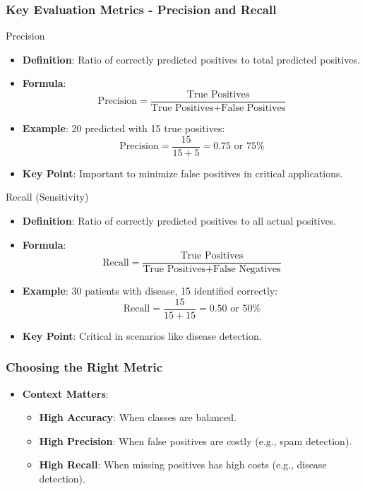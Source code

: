 \documentclass[aspectratio=169]{beamer}
\begin{document}
\begin{frame}[fragile]
    \frametitle{Key Evaluation Metrics - Precision and Recall}
    \begin{block}{Precision}
        \begin{itemize}
            \item \textbf{Definition}: Ratio of correctly predicted positives to total predicted positives.
            \item \textbf{Formula}:
            \begin{equation}
            \text{Precision} = \frac{\text{True Positives}}{\text{True Positives} + \text{False Positives}}
            \end{equation}
            \item \textbf{Example}: 20 predicted with 15 true positives:
            \[
            \text{Precision} = \frac{15}{15 + 5} = 0.75 \text{ or } 75\%
            \]
            \item \textbf{Key Point}: Important to minimize false positives in critical applications.
        \end{itemize}
    \end{block}

    \begin{block}{Recall (Sensitivity)}
        \begin{itemize}
            \item \textbf{Definition}: Ratio of correctly predicted positives to all actual positives.
            \item \textbf{Formula}:
            \begin{equation}
            \text{Recall} = \frac{\text{True Positives}}{\text{True Positives} + \text{False Negatives}}
            \end{equation}
            \item \textbf{Example}: 30 patients with disease, 15 identified correctly:
            \[
            \text{Recall} = \frac{15}{15 + 15} = 0.50 \text{ or } 50\%
            \]
            \item \textbf{Key Point}: Critical in scenarios like disease detection.
        \end{itemize}
    \end{block}
\end{frame}

\begin{frame}[fragile]
    \frametitle{Choosing the Right Metric}
    \begin{itemize}
        \item \textbf{Context Matters}:
        \begin{itemize}
            \item \textbf{High Accuracy}: When classes are balanced.
            \item \textbf{High Precision}: When false positives are costly (e.g., spam detection).
            \item \textbf{High Recall}: When missing positives has high costs (e.g., disease detection).
        \end{itemize}
    \end{itemize}
\end{frame}
\end{document}
